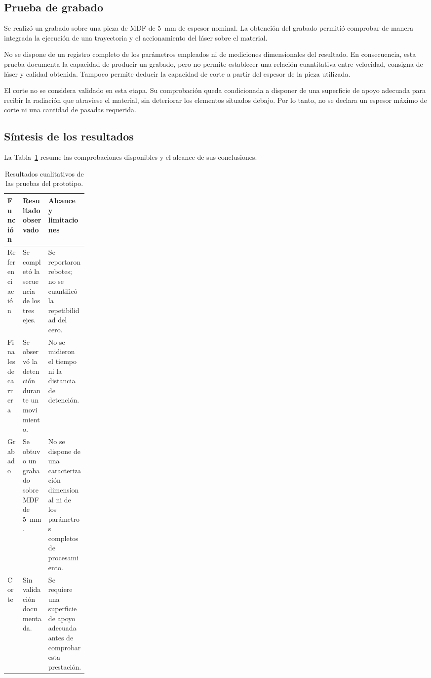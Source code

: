 \documentclass[blue,fullpaper]{ludusofficial}  %
\begin{document}
\subsection{Prueba de grabado}

Se realizó un grabado sobre una pieza de MDF
de 5~mm de espesor nominal. La obtención del grabado
permitió comprobar de manera integrada la ejecución
de una trayectoria y el accionamiento del láser
sobre el material.

No se dispone de un registro completo de los
parámetros empleados ni de mediciones dimensionales
del resultado. En consecuencia, esta prueba
documenta la capacidad de producir un grabado,
pero no permite establecer una relación cuantitativa
entre velocidad, consigna de láser y calidad obtenida.
Tampoco permite deducir la capacidad de corte
a partir del espesor de la pieza utilizada.

El corte no se considera validado en esta etapa.
Su comprobación queda condicionada a disponer
de una superficie de apoyo adecuada para recibir
la radiación que atraviese el material,
sin deteriorar los elementos situados debajo.
Por lo tanto, no se declara un espesor máximo
de corte ni una cantidad de pasadas requerida.

\subsection{Síntesis de los resultados}

La Tabla~\ref{tab:resultados-observados} resume
las comprobaciones disponibles y el alcance
de sus conclusiones.

\begin{table}[htbp]
\centering
\small
\caption{Resultados cualitativos de las pruebas del prototipo.}
\label{tab:resultados-observados}
\begin{tabularx}{\linewidth}{p{0.19\linewidth}XX}
\hline
\textbf{Función} & \textbf{Resultado observado} &
\textbf{Alcance y limitaciones} \\
\hline
Referenciación &
Se completó la secuencia de los tres ejes. &
Se reportaron rebotes; no se cuantificó
la repetibilidad del cero. \\
Finales de carrera &
Se observó la detención durante un movimiento. &
No se midieron el tiempo ni la distancia
de detención. \\
Grabado &
Se obtuvo un grabado sobre MDF de 5~mm. &
No se dispone de una caracterización
dimensional ni de los parámetros completos
de procesamiento. \\
Corte &
Sin validación documentada. &
Se requiere una superficie de apoyo adecuada
antes de comprobar esta prestación. \\
\hline
\end{tabularx}
\end{table}
\end{document}
